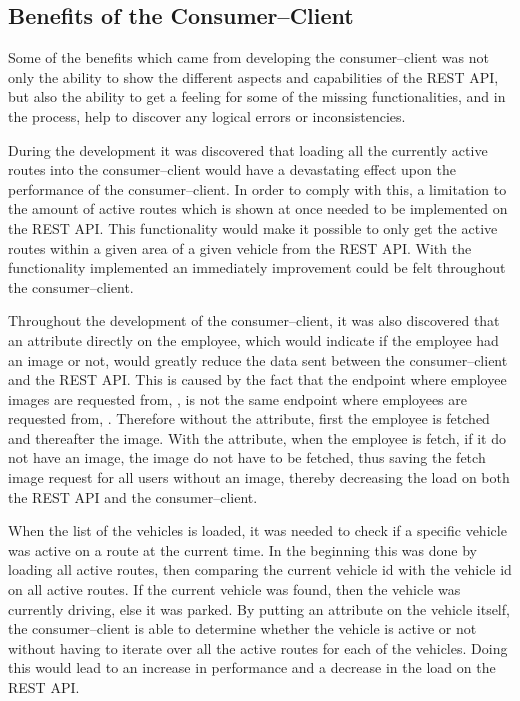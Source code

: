 \subsection{Benefits of the Consumer--Client}\label{ssec:benefits_consumer_client}
Some of the benefits which came from developing the consumer--client was not only the ability to show the different aspects and capabilities of the REST API, but also the ability to get a feeling for some of the missing functionalities, and in the process, help to discover any logical errors or inconsistencies.

\bigskip
During the development it was discovered that loading all the currently active routes into the consumer--client would have a devastating effect upon the performance of the consumer--client.
In order to comply with this, a limitation to the amount of active routes which is shown at once needed to be implemented on the REST API.
This functionality would make it possible to only get the active routes within a given area of a given vehicle from the REST API.
With the functionality implemented an immediately improvement could be felt throughout the consumer--client.

\bigskip
Throughout the development of the consumer--client, it was also discovered that an attribute directly on the employee, which would indicate if the employee had an image or not, would greatly reduce the data sent between the consumer--client and the REST API.
This is caused by the fact that the endpoint where employee images are requested from, , is not the same endpoint where employees are requested from, .
Therefore without the attribute, first the employee is fetched and thereafter the image.
With the attribute, when the employee is fetch, if it do not have an image, the image do not have to be fetched, thus saving the fetch image request for all users without an image, thereby decreasing the load on both the REST API and the consumer--client.

\bigskip
When the list of the vehicles is loaded, it was needed to check if a specific vehicle was active on a route at the current time.
In the beginning this was done by loading all active routes, then comparing the current vehicle id with the vehicle id on all active routes.
If the current vehicle was found, then the vehicle was currently driving, else it was parked.
By putting an attribute on the vehicle itself, the consumer--client is able to determine whether the vehicle is active or not without having to iterate over all the active routes for each of the vehicles.
Doing this would lead to an increase in performance and a decrease in the load on the REST API.


